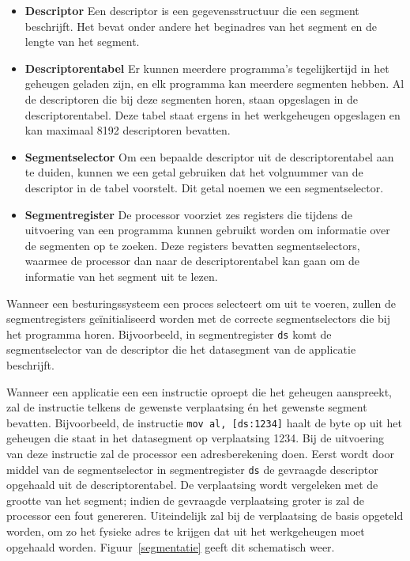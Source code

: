 \begin{itemize}
\item{\textbf{Descriptor}} Een descriptor is een gegevensstructuur die
een segment beschrijft. Het bevat onder andere het beginadres van het segment en
de lengte van het segment.
\item{\textbf{Descriptorentabel}} Er kunnen meerdere
programma's tegelijkertijd in het geheugen geladen zijn, en elk programma kan
meerdere segmenten hebben. Al de descriptoren die bij deze segmenten horen,
staan opgeslagen in de descriptorentabel. Deze tabel staat ergens in het
werkgeheugen opgeslagen en kan maximaal 8192 descriptoren bevatten.
\item{\textbf{Segmentselector}} Om een bepaalde descriptor uit de descriptorentabel aan
te duiden, kunnen we een getal gebruiken dat het volgnummer van de descriptor in
de tabel voorstelt. Dit getal noemen we een segmentselector.
\item{\textbf{Segmentregister}} De processor voorziet zes registers die tijdens de
uitvoering van een programma kunnen gebruikt worden om informatie over de
segmenten op te zoeken. Deze registers bevatten segmentselectors, waarmee de
processor dan naar de descriptorentabel kan gaan om de informatie van het
segment uit te lezen.
\end{itemize}

Wanneer een besturingssysteem een proces selecteert om uit te voeren, zullen de
segmentregisters ge\"initialiseerd worden met de correcte segmentselectors die
bij het programma horen. Bijvoorbeeld, in segmentregister \texttt{ds} komt de segmentselector
van de descriptor die het datasegment van de applicatie beschrijft.

Wanneer een applicatie een een instructie oproept die het geheugen aanspreekt, zal de instructie telkens de gewenste verplaatsing \'en het gewenste segment bevatten. Bijvoorbeeld, de instructie \texttt{mov al, [ds:1234]} haalt de byte op uit het geheugen die staat in het datasegment op verplaatsing 1234. Bij de uitvoering van deze instructie zal de processor een adresberekening doen. Eerst wordt door middel van de segmentselector in segmentregister \texttt{ds} de gevraagde descriptor opgehaald uit de descriptorentabel. De verplaatsing wordt vergeleken met de grootte van het segment; indien de gevraagde verplaatsing groter is zal de processor een fout genereren. Uiteindelijk zal bij de verplaatsing de basis opgeteld worden, om zo het fysieke adres te krijgen dat uit het werkgeheugen moet opgehaald worden. Figuur~\ref{segmentatie} geeft dit schematisch weer.

